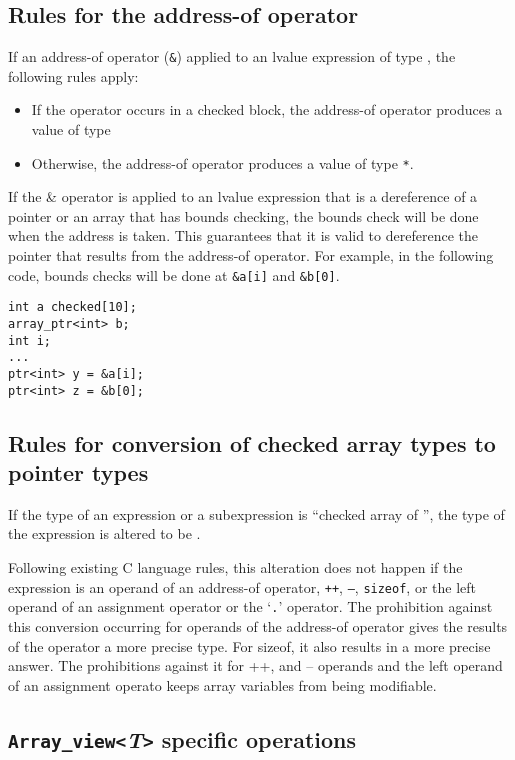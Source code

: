 \subsection{Rules for the address-of operator}

If an address-of operator (\texttt{\&}) applied to an lvalue expression
of type , the following rules apply:

\begin{itemize}
\item
  If the operator occurs in a checked block, the address-of operator
  produces a value of type
  \ptrT
\item
  Otherwise, the address-of operator produces a value of type 
  \texttt{*}.
\end{itemize}

If the \& operator is applied to an lvalue expression that is a
dereference of a pointer or an array that has bounds checking, the
bounds check will be done when the address is taken. This guarantees
that it is valid to dereference the pointer that results from the
address-of operator. For example, in the following code, bounds checks
will be done at \texttt{\&a[i]} and \texttt{\&b[0]}.

\begin{verbatim}
int a checked[10];
array_ptr<int> b;
int i;
...
ptr<int> y = &a[i];
ptr<int> z = &b[0];
\end{verbatim}

\subsection{Rules for conversion of checked array types to pointer types}

If the type of an expression or a subexpression is ``checked array of
'', the type of the expression is altered to be
\arrayptrT .

Following existing C language rules, this alteration does not happen if
the expression is an operand of an address-of operator, \texttt{++},
\texttt{--}, \texttt{sizeof}, or the left operand of an assignment
operator or the `\texttt{.}' operator. The prohibition against this
conversion occurring for operands of the address-of operator gives the
results of the operator a more precise type. For sizeof, it also results
in a more precise answer. The prohibitions against it for ++, and --
operands and the left operand of an assignment operato keeps array
variables from being modifiable.

\subsection{\texttt{Array\_view<}\textit{T}\texttt{>} specific operations}

